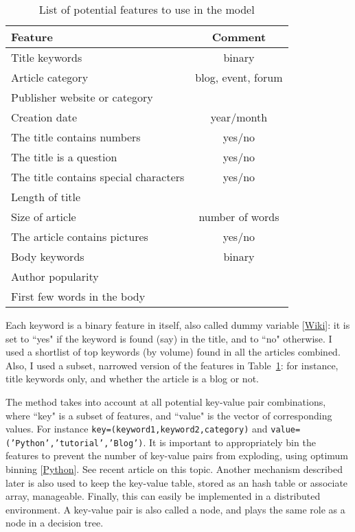 \documentclass[oneside,10pt]{book}
\renewcommand{\arraystretch}{1.4} %
\begin{document}
\begin{table}%
\begin{center}
\small
\begin{tabular}{lc}
\hline
   Feature & Comment \\
\hline
Title keywords &  binary\\
Article category & blog, event, forum\\
Publisher website or category & \\
Creation date & year/month\\
The title contains numbers & yes/no\\
The title is a question & yes/no \\
The title contains special characters & yes/no \\
Length of title & \\
Size of article & number of words \\
The article contains pictures & yes/no\\
Body keywords & binary \\
Author popularity & \\
First few words in the body & \\
\hline
\end{tabular}
\caption{\label{fffdsa}List of potential features to use in the model}
\end{center}
\end{table}
\renewcommand{\arraystretch}{1.0} %


\noindent Each keyword is a binary feature in itself, also called \textcolor{index}{dummy variable} [\href{https://en.wikipedia.org/wiki/Dummy_variable_(statistics)}{Wiki}]: it is set to ``yes" if the keyword is found (say) in the title, and to ``no" otherwise. I used
 a shortlist of top keywords (by volume) found in all the articles combined. Also, I used a subset, narrowed version
of the features in Table~\ref{fffdsa}: for instance, title keywords only, and whether the article is a blog or not.

 The method takes into account at all potential \textcolor{index}{key-value pair} combinations, where ``key" is a subset of features, and ``value" is the vector of corresponding values.
For instance \texttt{key=(keyword1,keyword2,category)} and \texttt{value=('Python','tutorial','Blog')}. It is important to appropriately bin the features
 to prevent the number of key-value pairs from exploding, using \textcolor{index}{optimum binning} [\href{http://gnpalencia.org/optbinning/}{Python}].
See recent article \cite{binh2020} on this topic. Another mechanism described later  is also used to keep the key-value table, stored as an hash table or associate array, manageable. Finally, this can easily be implemented in a distributed environment.
A key-value pair is also called a \textcolor{index}{node}, and plays the same role as a node in a decision tree.
\end{document}
